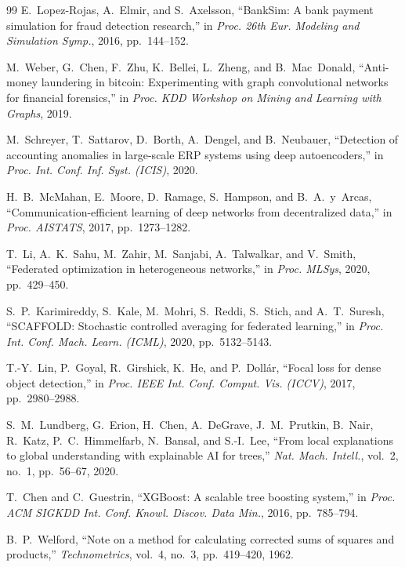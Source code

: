 \documentclass[journal]{IEEEtran}
\begin{document}
\begin{thebibliography}{99}
E.~Lopez-Rojas, A.~Elmir, and S.~Axelsson, ``BankSim: A bank payment simulation for fraud detection research,'' in \emph{Proc. 26th Eur. Modeling and Simulation Symp.}, 2016, pp.~144--152.

M.~Weber, G.~Chen, F.~Zhu, K.~Bellei, L.~Zheng, and B.~Mac~Donald, ``Anti-money laundering in bitcoin: Experimenting with graph convolutional networks for financial forensics,'' in \emph{Proc. KDD Workshop on Mining and Learning with Graphs}, 2019.

M.~Schreyer, T.~Sattarov, D.~Borth, A.~Dengel, and B.~Neubauer, ``Detection of accounting anomalies in large-scale ERP systems using deep autoencoders,'' in \emph{Proc. Int. Conf. Inf. Syst. (ICIS)}, 2020.

H.~B.~McMahan, E.~Moore, D.~Ramage, S.~Hampson, and B.~A.~y~Arcas, ``Communication-efficient learning of deep networks from decentralized data,'' in \emph{Proc. AISTATS}, 2017, pp.~1273--1282.

T.~Li, A.~K.~Sahu, M.~Zahir, M.~Sanjabi, A.~Talwalkar, and V.~Smith, ``Federated optimization in heterogeneous networks,'' in \emph{Proc. MLSys}, 2020, pp.~429--450.

S.~P.~Karimireddy, S.~Kale, M.~Mohri, S.~Reddi, S.~Stich, and A.~T.~Suresh, ``SCAFFOLD: Stochastic controlled averaging for federated learning,'' in \emph{Proc. Int. Conf. Mach. Learn. (ICML)}, 2020, pp.~5132--5143.

T.-Y.~Lin, P.~Goyal, R.~Girshick, K.~He, and P.~Doll\'ar, ``Focal loss for dense object detection,'' in \emph{Proc. IEEE Int. Conf. Comput. Vis. (ICCV)}, 2017, pp.~2980--2988.

S.~M.~Lundberg, G.~Erion, H.~Chen, A.~DeGrave, J.~M.~Prutkin, B.~Nair, R.~Katz, P.~C.~Himmelfarb, N.~Bansal, and S.-I.~Lee, ``From local explanations to global understanding with explainable AI for trees,'' \emph{Nat. Mach. Intell.}, vol.~2, no.~1, pp.~56--67, 2020.

T.~Chen and C.~Guestrin, ``XGBoost: A scalable tree boosting system,'' in \emph{Proc. ACM SIGKDD Int. Conf. Knowl. Discov. Data Min.}, 2016, pp.~785--794.

B.~P.~Welford, ``Note on a method for calculating corrected sums of squares and products,'' \emph{Technometrics}, vol.~4, no.~3, pp.~419--420, 1962.

\end{thebibliography}
\end{document}
